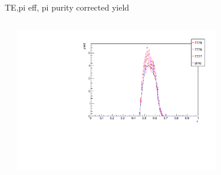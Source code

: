 \begin{frame}{TE,pi eff, pi purity corrected yield}
\begin{columns}
\begin{column}[T]{0.5\textwidth}
\end{column}
\begin{column}[T]{0.5\textwidth}
\includegraphics[width = 0.7\textwidth]{results/yield/check/yieldcheck_510_pos.pdf}
\end{column}
\end{columns}
\end{frame}
